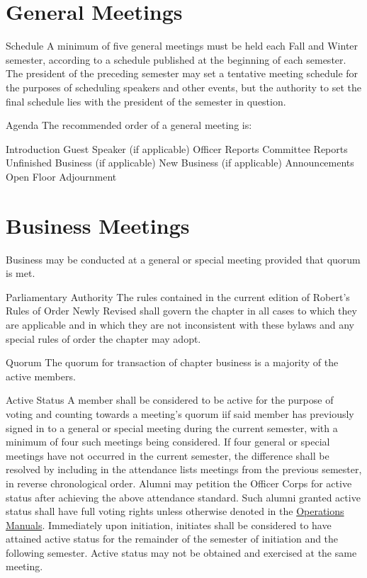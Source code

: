 \section{General Meetings}\label{sec:genmeetings} 
\begin{enumsubsection}
\item{Schedule} A minimum of five general meetings must be held each Fall and Winter semester, according to a schedule published at the beginning of each semester. The president of the preceding semester may set a tentative meeting schedule for the purposes of scheduling speakers and other events, but the authority to set the final schedule lies with the president of the semester in question. 
\item{Agenda} The recommended order of a general meeting is:
\begin{enumsubsubsection}
\itemnotoc Introduction
\itemnotoc Guest Speaker (if applicable)
\itemnotoc Officer Reports
\itemnotoc Committee Reports
\itemnotoc Unfinished Business (if applicable)
\itemnotoc New Business (if applicable)
\itemnotoc Announcements
\itemnotoc Open Floor
\itemnotoc Adjournment
\end{enumsubsubsection}
\end{enumsubsection}

\section{Business Meetings}
Business may be conducted at a general or special meeting provided that quorum is met. 

\begin{enumsubsection}
\item{Parliamentary Authority} The rules contained in the current edition of Robert's Rules of Order Newly Revised shall govern the chapter in all cases to which they are applicable and in which they are not inconsistent with these bylaws and any special rules of order the chapter may adopt.
\item{Quorum} The quorum for transaction of chapter business is a majority of the active members.
\item{Active Status} A member shall be considered to be active for the purpose of voting and counting towards a meeting's quorum iif said member has previously signed in to a general or special meeting during the current semester, with a minimum of four such meetings being considered. If four general or special meetings have not occurred in the current semester, the difference shall be resolved by including in the attendance lists meetings from the previous semester, in reverse chronological order. Alumni may petition the Officer Corps for active status after achieving the above attendance standard. Such alumni granted active status shall have full voting rights unless otherwise denoted in the \hkn \href{http://www.ieee.org/education_careers/education/ieee_hkn/about/operations_manual.pdf}{Operations Manuals}. Immediately upon initiation, initiates shall be considered to have attained active status for the remainder of the semester of initiation and the following semester. Active status may not be obtained and exercised at the same meeting.
\end{enumsubsection}

